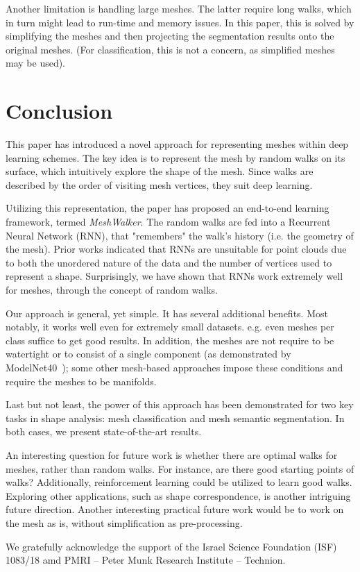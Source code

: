 \documentclass[acmtog]{acmart}
\begin{document}
Another limitation is handling large meshes.
The latter require long walks, which in turn might lead to run-time and memory issues.
In this paper, this is solved by simplifying the meshes and then projecting the segmentation results onto the original meshes.
(For classification, this is not a concern, as simplified meshes may be used).


\section{Conclusion}
\label{sec:conclusion}
This paper has introduced a novel approach for representing meshes within deep learning schemes. 
The key idea is to represent the mesh by random walks on its surface, which intuitively explore the shape of the mesh.
Since walks are described by the order of visiting mesh vertices, they suit deep learning.

Utilizing this representation, the paper has proposed an end-to-end learning framework, termed {\em MeshWalker}.
The random walks are fed into a Recurrent Neural Network (RNN), that "remembers" the walk’s history (i.e. the geometry of the mesh).
Prior works indicated that RNNs are unsuitable for point clouds due to both the unordered nature of the data and the number of vertices used to represent a shape. Surprisingly, we have shown that RNNs work extremely well for meshes, through the concept of random walks. 

Our approach is general, yet simple.
It has several additional benefits.
Most notably, it works well even for extremely small datasets. e.g.  even  meshes per class suffice  to get good results. 
In addition, the meshes are not require to be watertight or to consist of a single component (as demonstrated by ModelNet40~\cite{wu20153d}); some other mesh-based approaches impose these conditions and require the meshes to be manifolds.

Last but not least, the power of this approach has been demonstrated for two key tasks in shape analysis: mesh classification and mesh semantic segmentation. 
In both cases, we present  state-of-the-art  results.

An interesting question for future work is whether there are optimal walks for meshes, rather than random walks.
For instance, are there good starting points of walks?
Additionally, reinforcement learning could be utilized to learn good walks.
Exploring other applications, such as shape correspondence,
is another intriguing future direction.
Another interesting practical future work would be to work on the mesh as is, without simplification as pre-processing.

\begin{acks}
  We gratefully acknowledge the support of the Israel Science Foundation (ISF) 1083/18 amd PMRI -- Peter Munk Research Institute -- Technion.
\end{acks}





 
\end{document}
